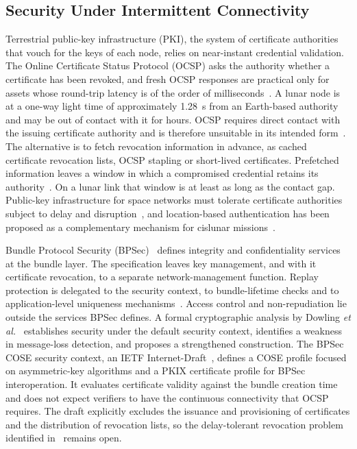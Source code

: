 \documentclass{IEEEoj}
\begin{document}
\subsection{Security Under Intermittent Connectivity}
Terrestrial public-key infrastructure (PKI), the system of certificate authorities that vouch for the keys of each node, relies on near-instant credential validation. The Online Certificate Status Protocol (OCSP) asks the authority whether a certificate has been revoked, and fresh OCSP responses are practical only for assets whose round-trip latency is of the order of milliseconds~\cite{foerster_pki}. A lunar node is at a one-way light time of approximately \SI{1.28}{\second} from an Earth-based authority and may be out of contact with it for hours. OCSP requires direct contact with the issuing certificate authority and is therefore unsuitable in its intended form~\cite{koisser_pki_space}. The alternative is to fetch revocation information in advance, as cached certificate revocation lists, OCSP stapling or short-lived certificates. Prefetched information leaves a window in which a compromised credential retains its authority~\cite{foerster_pki}. On a lunar link that window is at least as long as the contact gap. Public-key infrastructure for space networks must tolerate certificate authorities subject to delay and disruption~\cite{foerster_pki,koisser_pki_space}, and location-based authentication has been proposed as a complementary mechanism for cislunar missions~\cite{jedermann_location_auth}.

Bundle Protocol Security (BPSec)~\cite{rfc9172} defines integrity and confidentiality services at the bundle layer. The specification leaves key management, and with it certificate revocation, to a separate network-management function. Replay protection is delegated to the security context, to bundle-lifetime checks and to application-level uniqueness mechanisms~\cite{rfc9172}. Access control and non-repudiation lie outside the services BPSec defines. A formal cryptographic analysis by Dowling \emph{et al.}~\cite{dowling_bpsec} establishes security under the default security context, identifies a weakness in message-loss detection, and proposes a strengthened construction. The BPSec COSE security context, an IETF Internet-Draft~\cite{bpsec_cose}, defines a COSE profile focused on asymmetric-key algorithms and a PKIX certificate profile for BPSec interoperation. It evaluates certificate validity against the bundle creation time and does not expect verifiers to have the continuous connectivity that OCSP requires. The draft explicitly excludes the issuance and provisioning of certificates and the distribution of revocation lists, so the delay-tolerant revocation problem identified in~\cite{foerster_pki,koisser_pki_space} remains open.
\end{document}
